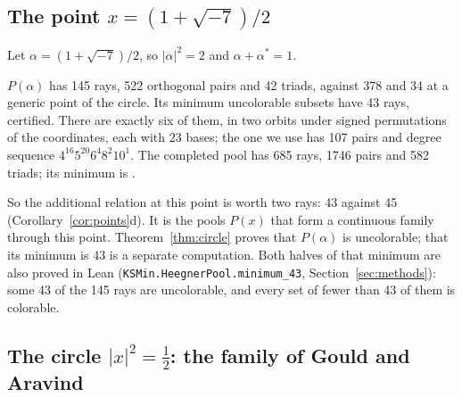 \subsection{The point $x=(1+\sqrt{-7})/2$}

Let $\alpha=(1+\sqrt{-7})/2$, so $|\alpha|^2=2$ and $\alpha+\alpha^{*}=1$.

\begin{fact}\label{fact:heegner}
$P(\alpha)$ has 145 rays, 522 orthogonal pairs and 42 triads, against 378 and 34 at a generic
point of the circle.  Its minimum uncolorable subsets have 43 rays, certified.  There are exactly
six of them, in two orbits under signed permutations of the coordinates, each with 23 bases; the
one we use has 107 pairs and degree sequence $4^{16}5^{20}6^{4}8^{2}10^{1}$.  The completed pool
has 685 rays, 1746 pairs and 582 triads; its minimum is \heegnercompletedmin.
\end{fact}

So the additional relation at this point is worth two rays: 43 against 45
(Corollary~\ref{cor:points}d).  It is the pools $P(x)$ that form a continuous family through
this point.  Theorem~\ref{thm:circle} proves that $P(\alpha)$ is uncolorable; that its minimum is
43 is a separate computation.  Both halves of that minimum are also proved in Lean
(\texttt{KSMin.HeegnerPool.minimum\_43}, Section~\ref{sec:methods}): some 43 of the 145 rays are
uncolorable, and every set of fewer than 43 of them is colorable.

\subsection{The circle $|x|^2=\tfrac12$: the family of Gould and Aravind}\label{sec:halfcircle}

